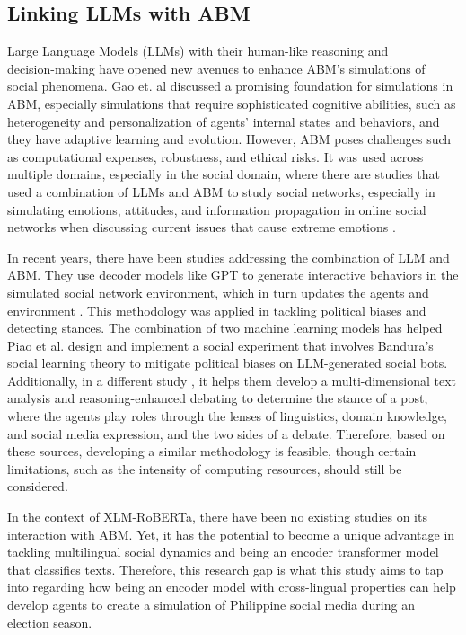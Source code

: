 \subsection{Linking LLMs with ABM}
Large Language Models (LLMs) with their human-like reasoning and\\
decision-making have opened new avenues to enhance ABM’s simulations of social phenomena. Gao et. al \cite{Gao-2024} discussed a promising foundation for simulations in ABM, especially simulations that require sophisticated cognitive abilities, such as heterogeneity and personalization of agents’ internal states and behaviors, and they have adaptive learning and evolution. However, ABM poses challenges such as computational expenses, robustness, and ethical risks. It was used across multiple domains, especially in the social domain, where there are studies that used a combination of LLMs and ABM to study social networks, especially in simulating emotions, attitudes, and information propagation in online social networks when discussing current issues that cause extreme emotions \cite{Gao-2024}.

In recent years, there have been studies addressing the combination of LLM and ABM. They use decoder models like GPT to generate interactive behaviors in the simulated social network environment, which in turn updates the agents and environment \cite{Gao-2025, Lan-2024, Piao-2025}. This methodology was applied in tackling political biases and detecting stances. The combination of two machine learning models has helped Piao et al. \cite{Piao-2025} design and implement a social experiment that involves Bandura’s social learning theory to mitigate political biases on LLM-generated social bots. Additionally, in a different study \cite{Lan-2024}, it helps them develop a multi-dimensional text analysis and reasoning-enhanced debating to determine the stance of a post, where the agents play roles through the lenses of linguistics, domain knowledge, and social media expression, and the two sides of a debate.  Therefore, based on these sources, developing a similar methodology is feasible, though certain limitations, such as the intensity of computing resources, should still be considered.

In the context of XLM-RoBERTa, there have been no existing studies on its interaction with ABM. Yet, it has the potential to become a unique advantage in tackling multilingual social dynamics and being an encoder transformer model that classifies texts. Therefore, this research gap is what this study aims to tap into regarding how being an encoder model with cross-lingual properties can help develop agents to create a simulation of Philippine social media during an election season.


